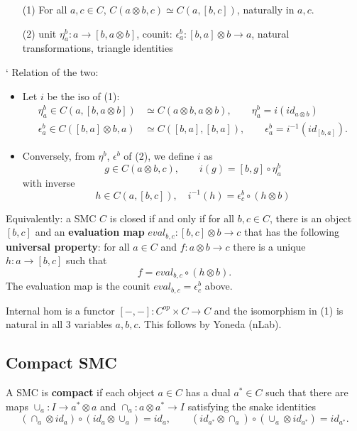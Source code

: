\documentclass[12pt]{article}
\theoremstyle{definition}
\theoremstyle{remark}
\begin{document}
\begin{enumerate}
\item[(1)] For all $a,c\in C$, $C(a\otimes b,c)\simeq C(a,[b,c])$, naturally in $a,c$.
\item[(2)] unit $\eta^b_a: a\to [b,a\otimes b]$, counit: $\epsilon^b_a: [b,a]\otimes
b\to a$, natural transformations, triangle identities
\end{enumerate}
`
Relation of the two: 
\begin{itemize}
\item Let $i$ be the iso of (1): 
\begin{align*}
\eta^b_a\in C(a,[b,a\otimes b])&\simeq C(a\otimes b,a\otimes b),\qquad
\eta^b_a=i(id_{a\otimes b})\\
\epsilon^b_a\in C([b,a]\otimes b,a)&\simeq C([b,a],[b,a]),\qquad \epsilon^b_a=i^{-1}(id_{[b,a]}).
\end{align*}
\item Conversely, from $\eta^b$, $\epsilon^b$ of (2), we define $i$ as 
\[
g\in C(a\otimes b,c),\qquad i(g)=[b,g]\circ \eta^b_a
\]
with inverse
\[
h\in C(a,[b,c]),\quad i^{-1}(h)=\epsilon^b_c\circ (h\otimes b)
\]

\end{itemize}

\medskip
\noindent
Equivalently: a SMC $C$ is closed if and only if for all $b,c\in C$, there is an object
$[b,c]$ and an \textbf{evaluation map} $eval_{b,c}: [b,c]\otimes b\to c$ that has the
following \textbf{universal property}: for all $a\in C$ and $f:a\otimes b\to c$ there is a
unique $h:a\to [b,c]$ such that
\[
f=eval_{b,c}\circ(h\otimes b).
\]
The evaluation map is the counit $eval_{b,c}=\epsilon^b_c$ above.

\medskip
\noindent
Internal hom is a functor $[-,-]: C^{op}\times C\to C$ and the isomorphism in
(1) is natural in all 3 variables $a,b,c$. This follows by  Yoneda (nLab).


\subsection{Compact SMC}

A SMC is \textbf{compact} if each object $a\in C$ has a dual $a^*\in C$ such that there
are maps $\cup_a: I\to a^*\otimes a$ and $\cap_a: a\otimes a^*\to I$ satisfying the snake
identities
\[
(\cap_a\otimes id_a)\circ (id_a\otimes \cup_a)=id_a,\qquad (id_{a^*}\otimes
\cap_a)\circ (\cup_a\otimes id_{a^*})=id_{a^*}.
\]
\end{document}
